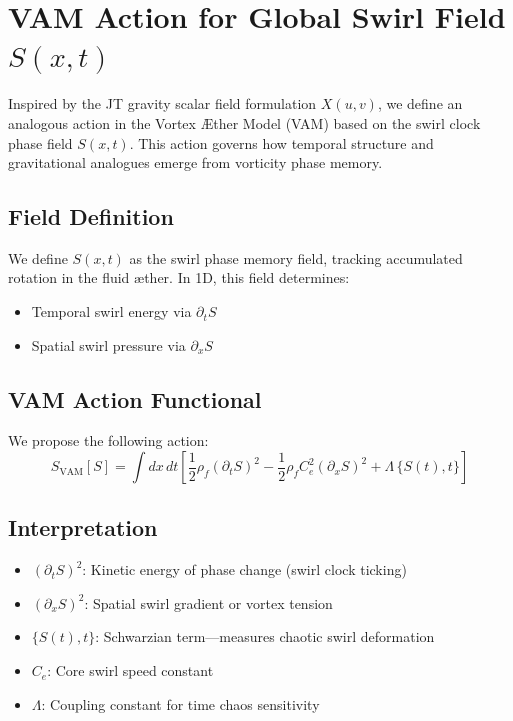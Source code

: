 \documentclass[preprint]{revtex4-2}
\begin{document}
            \section*{VAM Action for Global Swirl Field $S(x,t)$}
            Inspired by the JT gravity scalar field formulation $X(u,v)$, we define an analogous action in the Vortex \AE ther Model (VAM) based on the swirl clock phase field $S(x,t)$. This action governs how temporal structure and gravitational analogues emerge from vorticity phase memory.

            \subsection*{Field Definition}
            We define $S(x,t)$ as the swirl phase memory field, tracking accumulated rotation in the fluid æther. In 1D, this field determines:
            \begin{itemize}
            \item Temporal swirl energy via $\partial_t S$
            \item Spatial swirl pressure via $\partial_x S$
            \end{itemize}

            \subsection{VAM Action Functional}
            We propose the following action:
            \begin{equation}
            \boxed{
            S_{\text{VAM}}[S] = \int dx \, dt \left[
            \frac{1}{2} \rho_{\scriptscriptstyle\boldsymbol\!f} (\partial_t S)^2
            - \frac{1}{2} \rho_{\scriptscriptstyle\boldsymbol\!f} C_e^2 (\partial_x S)^2
            + \Lambda \, \{ S(t), t \}
            \right]
            }
            \end{equation}

            \subsection*{Interpretation}
            \begin{itemize}
            \item $(\partial_t S)^2$: Kinetic energy of phase change (swirl clock ticking)
            \item $(\partial_x S)^2$: Spatial swirl gradient or vortex tension
                \item $\{ S(t), t \}$: Schwarzian term—measures chaotic swirl deformation
            \item $C_e$: Core swirl speed constant
            \item $\Lambda$: Coupling constant for time chaos sensitivity
            \end{itemize}
\end{document}
